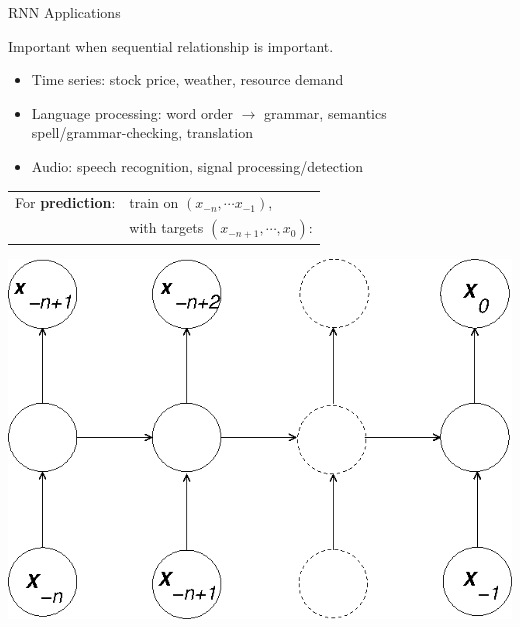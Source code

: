 \documentclass[12pt,t]{beamer}
\begin{document}
\begin{frame}{RNN Applications}

Important when sequential relationship is important.

\begin{itemize}
\item Time series:  stock price, weather,  resource demand
\item Language processing: word order $\rightarrow$ grammar, semantics \\
\hspace{1cm} spell/grammar-checking, translation 
\item Audio: speech recognition, signal processing/detection
\end{itemize}


\end{frame}

\begin{frame}
\begin{tabular}{ll}
For {\bf prediction}: &  train on $(x_{-n}, \cdots x_{-1})$, \\
& with targets $(x_{-n+1}, \cdots, x_0)$:
\end{tabular}

 \centerline{
\includegraphics[height=0.7\textheight]{./images/rnn-predict.png} 
}

\end{frame}
\end{document}
